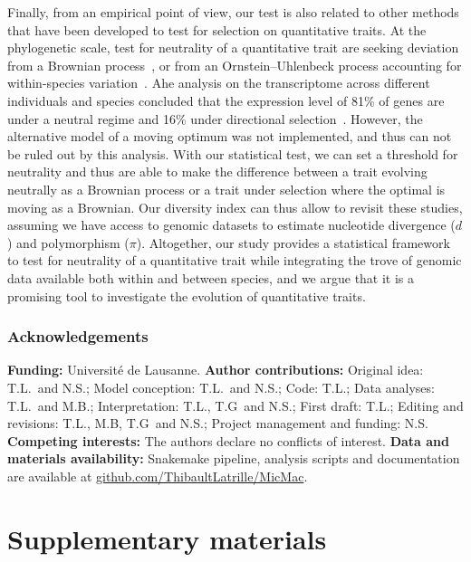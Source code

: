 \documentclass{article}
\begin{document}
Finally, from an empirical point of view, our test is also related to other methods that have been developed to test for selection on quantitative traits.
At the phylogenetic scale, test for neutrality of a quantitative trait are seeking deviation from a Brownian process~\cite{catalan_drift_2019}, or from an Ornstein–Uhlenbeck process accounting for within-species variation~\cite{rohlfs_phylogenetic_2015}.
Ahe analysis on the transcriptome across different individuals and species concluded that the expression level of 81\% of genes are under a neutral regime and 16\% under directional selection~\cite{catalan_drift_2019}.
However, the alternative model of a moving optimum was not implemented, and thus can not be ruled out by this analysis.
With our statistical test, we can set a threshold for neutrality and thus are able to make the difference between a trait evolving neutrally as a Brownian process or a trait under selection where the optimal is moving as a Brownian.
Our diversity index can thus allow to revisit these studies, assuming we have access to genomic datasets to estimate nucleotide divergence ($d$) and polymorphism ($\pi$).
Altogether, our study provides a statistical framework to test for neutrality of a quantitative trait while integrating the trove of genomic data available both within and between species, and we argue that it is a promising tool to investigate the evolution of quantitative traits.

\section*{Acknowledgements}
\label{sec:acknowledgment}
\textbf{Funding:}
Université de Lausanne.
\textbf{Author contributions:}
Original idea: T.L.\ and N.S.;
Model conception: T.L.\ and N.S.;
Code: T.L.;
Data analyses: T.L.\ and M.B.;
Interpretation: T.L., T.G\ and N.S.;
First draft: T.L.;
Editing and revisions: T.L., M.B, T.G\ and N.S.;
Project management and funding: N.S\@.
\textbf{Competing interests:}
The authors declare no conflicts of interest.
\textbf{Data and materials availability:}
Snakemake pipeline, analysis scripts and documentation are available at \href{https://github.com/ThibaultLatrille/MicMac}{github.com/ThibaultLatrille/MicMac}.

\printbibliography

\newpage

\part*{Supplementary materials}
\renewcommand{\thetable}{S\arabic{table}}
\renewcommand{\thefigure}{S\arabic{figure}}
\setcounter{figure}{0}
\setcounter{table}{0}
\setcounter{section}{0}
\end{document}
